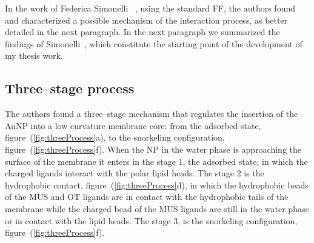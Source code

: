 In the work of Federica Simonelli \etal\, \cite{ourPaper}, using the standard \martini \ac{FF}, the authors found 
and characterized a possible mechanism of the interaction process, as better detailed in the next paragraph. In 
the next paragraph we summarized the findings of Simonelli \etal\,, which constitute the starting point of the 
development of my thesis work.

\subsection{Three--stage process}
The authors found a three--stage mechanism that regulates the insertion of the \ac{AuNP} into a low curvature 
membrane core: from the adsorbed state, figure~(\ref{fig:threeProcess}a), to the snorkeling configuration, 
figure~(\ref{fig:threeProcess}f). When the \ac{NP} in the water phase is approaching the surface of the membrane 
it enters in the stage $1$, the adsorbed state, in which the charged ligands interact with the polar lipid heads. 
The stage $2$ is the hydrophobic contact, figure~(\ref{fig:threeProcess}d), in which the hydrophobic beads of the 
\ac{MUS} and \ac{OT} ligands are in contact with the hydrophobic tails of the membrane while the charged bead of 
the \ac{MUS} ligands are still in the water phase or in contact with the lipid heads. The stage $3$, is the 
snorkeling configuration, figure~(\ref{fig:threeProcess}f). 


